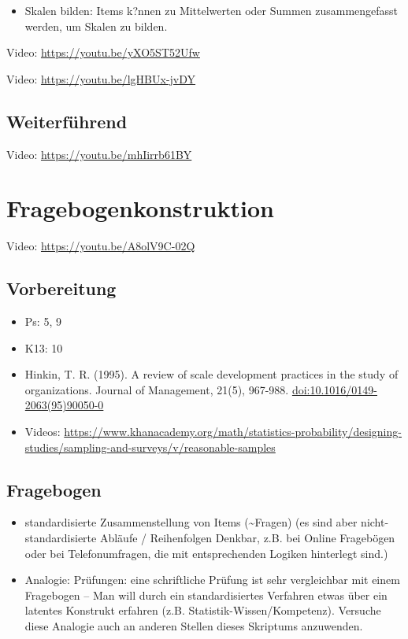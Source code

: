 \documentclass[
]{book}
\providecommand{\tightlist}{%
  \setlength{\itemsep}{0pt}\setlength{\parskip}{0pt}}
\begin{document}
\begin{itemize}
\tightlist
\item
  Skalen bilden: Items k?nnen zu Mittelwerten oder Summen zusammengefasst werden, um Skalen zu bilden.
\end{itemize}

Video: \url{https://youtu.be/yXO5ST52Ufw}

Video: \url{https://youtu.be/lgHBUx-jvDY}

\hypertarget{weiterfuxfchrend}{%
\section{Weiterführend}\label{weiterfuxfchrend}}

Video: \url{https://youtu.be/mhIirrb61BY}

\hypertarget{fragebogenkonstruktion}{%
\chapter{Fragebogenkonstruktion}\label{fragebogenkonstruktion}}

Video: \url{https://youtu.be/A8olV9C-02Q}

\hypertarget{vorbereitung}{%
\section{Vorbereitung}\label{vorbereitung}}

\begin{itemize}
\tightlist
\item
  Ps: 5, 9
\item
  K13: 10
\item
  Hinkin, T. R. (1995). A review of scale development practices in the study of organizations. Journal of Management, 21(5), 967-988. \url{doi:10.1016/0149-2063(95)90050-0}
\item
  Videos: \url{https://www.khanacademy.org/math/statistics-probability/designing-studies/sampling-and-surveys/v/reasonable-samples}
\end{itemize}

\hypertarget{fragebogen}{%
\section{Fragebogen}\label{fragebogen}}

\begin{itemize}
\tightlist
\item
  standardisierte Zusammenstellung von Items (\textasciitilde Fragen) (es sind aber nicht-standardisierte Abläufe / Reihenfolgen Denkbar, z.B. bei Online Fragebögen oder bei Telefonumfragen, die mit entsprechenden Logiken hinterlegt sind.)
\item
  Analogie: Prüfungen: eine schriftliche Prüfung ist sehr vergleichbar mit einem Fragebogen -- Man will durch ein standardisiertes Verfahren etwas über ein latentes Konstrukt erfahren (z.B. Statistik-Wissen/Kompetenz). Versuche diese Analogie auch an anderen Stellen dieses Skriptums anzuwenden.
\end{itemize}
\end{document}
